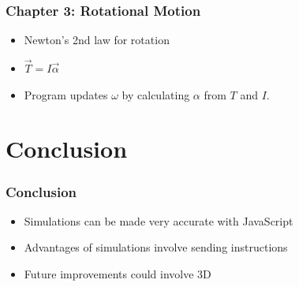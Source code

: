 \documentclass{beamer}
\begin{document}
\begin{frame}
\frametitle{Chapter 3: Rotational Motion}

\begin{itemize}

\item Newton's 2nd law for rotation

\item $
\vec{T} = I \vec{\alpha}
$


\vspace{1cm}

\item Program updates $\omega$ by calculating $\alpha$ from $T$ and $I$.
\end{itemize}
\end{frame}




\section{Conclusion}

\begin{frame}
\frametitle{Conclusion}

\begin{itemize}

\item Simulations can be made very accurate with JavaScript

\item Advantages of simulations involve sending instructions

\item Future improvements could involve 3D

\end{itemize}

\end{frame}
\end{document}
